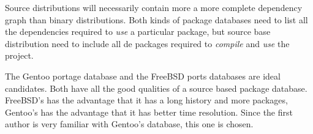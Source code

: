 \documentclass[smallextended,final]{svjour3}
\begin{document}
Source distributions will necessarily contain more a more complete dependency graph than binary distributions. Both kinds of package databases need to list all the dependencies required to \emph{use} a particular package, but source base distribution need to include all de packages required to \emph{compile} and \emph{use} the project.

The Gentoo portage database and the FreeBSD ports databases are ideal candidates. Both have all the good qualities of a source based package database. FreeBSD's has the advantage that it has a long history and more packages, Gentoo's has the advantage that it has better time resolution. Since the first author is very familiar with Gentoo's database, this one is chosen.
\end{document}
